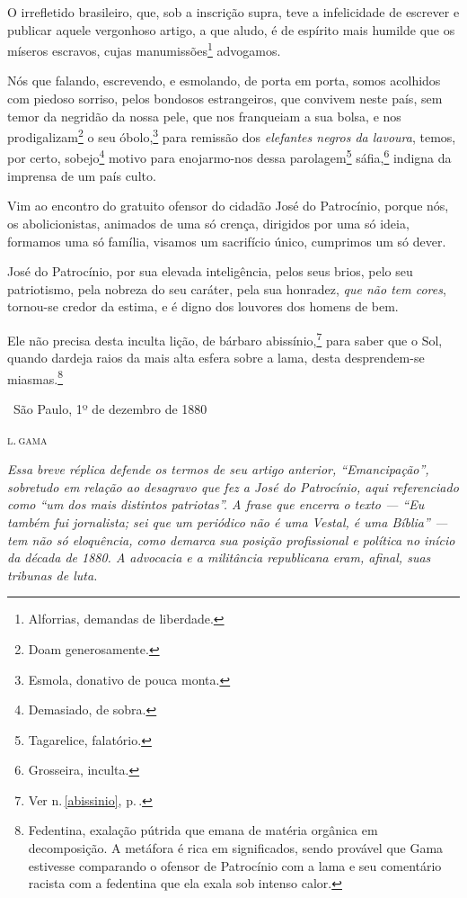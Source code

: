 O irrefletido brasileiro, que, sob a inscrição supra, teve a
infelicidade de escrever e publicar aquele vergonhoso artigo, a que
aludo, é de espírito mais humilde que os míseros escravos, cujas
manumissões\footnote{Alforrias, demandas de liberdade.} advogamos.

Nós que falando, escrevendo, e esmolando, de porta em porta, somos
acolhidos com piedoso sorriso, pelos bondosos estrangeiros, que convivem
neste país, sem temor da negridão da nossa pele, que nos franqueiam a
sua bolsa, e nos prodigalizam\footnote{Doam generosamente.} o seu
óbolo,\footnote{Esmola, donativo de pouca monta.} para remissão dos
\emph{elefantes negros da lavoura}, temos, por certo, sobejo\footnote{
  Demasiado, de sobra.} motivo para enojarmo-nos dessa
parolagem\footnote{Tagarelice, falatório.} sáfia,\footnote{
  Grosseira, inculta.} indigna da imprensa de um país culto.

Vim ao encontro do gratuito ofensor do cidadão José do Patrocínio,
porque nós, os abolicionistas, animados de uma só crença, dirigidos por
uma só ideia, formamos uma só família, visamos um sacrifício único,
cumprimos um só dever.

José do Patrocínio, por sua elevada inteligência, pelos seus brios, pelo
seu patriotismo, pela nobreza do seu caráter, pela sua honradez,
\emph{que não tem cores}, tornou-se credor da estima, e é digno dos
louvores dos homens de bem.

Ele não precisa desta inculta lição, de bárbaro abissínio,\footnote{Ver n.\,\ref{abissinio}, p.\,\pageref{abissinio}.} para saber que o Sol, quando dardeja
raios da mais alta esfera sobre a lama, desta desprendem-se
miasmas.\footnote{Fedentina, exalação pútrida que emana de matéria
  orgânica em decomposição. A metáfora é rica em significados, sendo
  provável que Gama estivesse comparando o ofensor de Patrocínio com a
  lama e seu comentário racista com a fedentina que ela exala sob
  intenso calor.}

\medskip

\hfill\ São Paulo, 1º de dezembro de 1880

\hfill\textsc{l.\,gama}


\begin{resumo}
\emph{Essa breve réplica defende os termos de seu artigo anterior, ``Emancipação'',
sobretudo em relação ao desagravo que fez a José
do Patrocínio, aqui referenciado como ``um dos mais distintos patriotas''.
A frase que encerra o texto --- ``Eu também fui jornalista; sei que um
periódico não é uma Vestal, é uma Bíblia'' --- tem não só eloquência,
como demarca sua posição profissional e política no início da década de
1880. A advocacia e a militância republicana eram, afinal, suas tribunas
de luta.}
\end{resumo}

